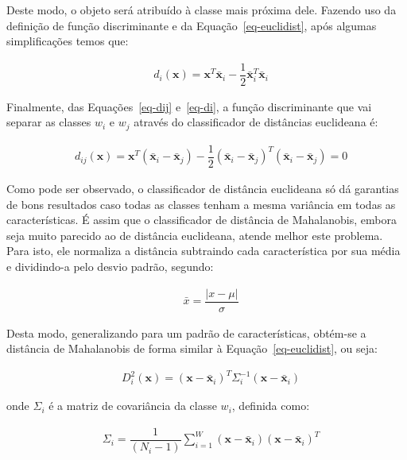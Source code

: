 Deste modo, o objeto será atribuído à classe mais próxima
dele. Fazendo uso da definição de função discriminante e da
Equação~\ref{eq-euclidist}, após algumas simplificações temos que:

\begin{align}\label{eq-di}
 &d_i(\textbf{x})= \textbf{x}^{T}\bar{\textbf{x}}_{i}-\dfrac{1}{2}\bar{\textbf{x}}_{i}^{T}\bar{\textbf{x}}_{i}
\end{align}

Finalmente, das Equações~\ref{eq-dij} e~\ref{eq-di}, a função
discriminante que vai separar as classes $w_i$ e $w_j$ através do
classificador de distâncias euclideana é:

\begin{align}\label{eq-fundiscri}
 &d_{ij}(\textbf{x})= \textbf{x}^{T}\left(\bar{\textbf{x}}_{i} - \bar{\textbf{x}}_{j}\right)-\dfrac{1}{2}\left(\bar{\textbf{x}}_{i} - \bar{\textbf{x}}_{j}\right)^{T}\left(\bar{\textbf{x}}_{i} - \bar{\textbf{x}}_{j}\right)=0
\end{align}

Como pode ser observado, o classificador de distância euclideana só dá
garantias de bons resultados caso todas as classes tenham a mesma
variância em todas as características. É assim que o classificador de
distância de Mahalanobis, embora seja muito parecido ao de distância
euclideana, atende melhor este problema. Para isto, ele normaliza a
distância subtraindo cada característica por sua média e dividindo-a
pelo desvio padrão, segundo:

\begin{align}
&\bar{x} = \dfrac{\left| x-\mu \right|}{\sigma}
\end{align}

Desta modo, generalizando para um padrão de características, obtém-se
a distância de Mahalanobis de forma similar à
Equação~\ref{eq-euclidist}, ou seja:

\begin{align}
 &D_i^2(\textbf{x})=\left(\textbf{x} - \bar{\textbf{x}}_i\right)^{T} \Sigma_{i}^{-1} \left(\textbf{x} - \bar{\textbf{x}}_i\right)
\end{align}

onde $\Sigma_{i}$ é a matriz de covariância da classe $w_{i}$,
definida como:

\begin{align}\label{eq-covariancia}
 &\Sigma_{i}=\dfrac{1}{(N_{i}-1)}\sum\limits_{i=1}^W{\left(\textbf{x} - \bar{\textbf{x}}_{i}\right)\left(\textbf{x} - \bar{\textbf{x}}_{i}\right)^{T}}
\end{align}

